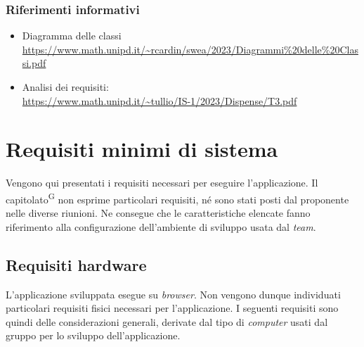 \documentclass[5pt]{article}
\begin{document}
			\subsubsection{Riferimenti informativi}
			\begin{itemize}
				\item Diagramma delle classi \\ \url{https://www.math.unipd.it/~rcardin/swea/2023/Diagrammi%20delle%20Classi.pdf}
				\item Analisi dei requisiti: \\ \url{https://www.math.unipd.it/~tullio/IS-1/2023/Dispense/T3.pdf}
			\end{itemize}
        
	\section{Requisiti minimi di sistema}
		\label{sec:requisiti}
		Vengono qui presentati i requisiti necessari per eseguire l'applicazione. Il capitolato\textsuperscript{G} non esprime particolari requisiti, né sono stati posti dal proponente nelle diverse riunioni.
		Ne consegue che le caratteristiche elencate fanno riferimento alla configurazione dell'ambiente di sviluppo usata dal \textit{team}.
              
		\subsection{Requisiti hardware}
			L'applicazione sviluppata esegue su \textit{browser}. Non vengono dunque individuati particolari requisiti fisici
			necessari per l'applicazione. I seguenti requisiti sono quindi delle considerazioni generali, derivate dal tipo di \textit{computer} usati dal gruppo per lo sviluppo dell'applicazione. 
			\begin{table}[H]
				\centering
				\caption{Requisiti Hardware}
			\end{table}
\end{document}
